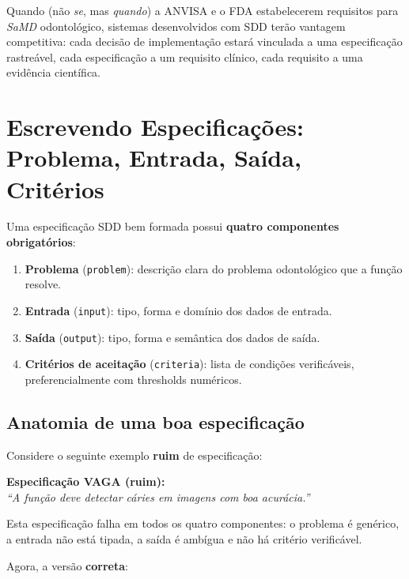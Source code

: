 Quando (não \textit{se}, mas \textit{quando}) a ANVISA e o FDA
estabelecerem requisitos para \textit{SaMD} odontológico, sistemas
desenvolvidos com SDD terão vantagem competitiva: cada decisão de
implementação estará vinculada a uma especificação rastreável, cada
especificação a um requisito clínico, cada requisito a uma evidência
científica.

\section{Escrevendo Especificações: Problema, Entrada, Saída, Critérios}

Uma especificação SDD bem formada possui \textbf{quatro componentes
obrigatórios}:

\begin{enumerate}
  \item \textbf{Problema} (\texttt{problem}): descrição clara do problema
    odontológico que a função resolve.
  \item \textbf{Entrada} (\texttt{input}): tipo, forma e domínio dos
    dados de entrada.
  \item \textbf{Saída} (\texttt{output}): tipo, forma e semântica dos
    dados de saída.
  \item \textbf{Critérios de aceitação} (\texttt{criteria}): lista de
    condições verificáveis, preferencialmente com thresholds numéricos.
\end{enumerate}

\subsection{Anatomia de uma boa especificação}

Considere o seguinte exemplo \textbf{ruim} de especificação:

\begin{mdframed}[linecolor=corTesteFalha, linewidth=2pt, backgroundcolor=corTesteFalha!5]
  \textbf{Especificação VAGA (ruim):} \\
  \textit{``A função deve detectar cáries em imagens com boa acurácia.''}
\end{mdframed}

Esta especificação falha em todos os quatro componentes: o problema é
genérico, a entrada não está tipada, a saída é ambígua e não há critério
verificável.

Agora, a versão \textbf{correta}:


